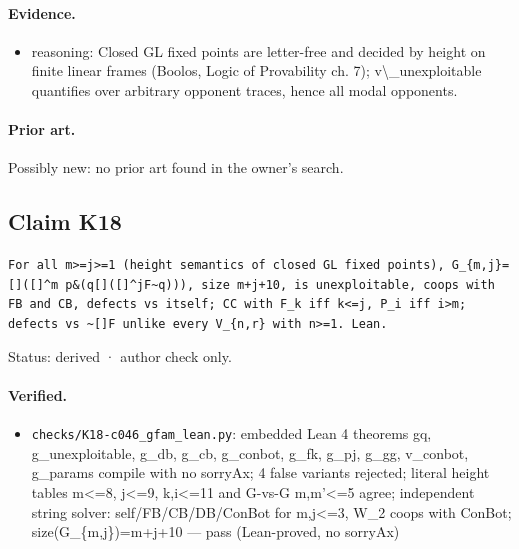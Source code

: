 \documentclass{article}
\begin{document}
\paragraph{Evidence.}
\begin{itemize}
\item reasoning: Closed GL fixed points are letter-free and decided by height on finite linear frames (Boolos, Logic of Provability ch. 7); v\textbackslash{}\_unexploitable quantifies over arbitrary opponent traces, hence all modal opponents.
\end{itemize}

\paragraph{Prior art.} Possibly new: no prior art found in the owner's search.

\subsection*{Claim K18}

\texttt{For all m\textgreater{}=j\textgreater{}=1 (height semantics of closed GL fixed points), G\_\{m,j\}=[]([]\textasciicircum{}m p\&(q\textbar{}[]([]\textasciicircum{}jF\textbar{}\textasciitilde{}q))), size m+j+10, is unexploitable, coops with FB and CB, defects vs itself; CC with F\_k iff k\textless{}=j, P\_i iff i\textgreater{}m; defects vs \textasciitilde{}[]F unlike every V\_\{n,r\} with n\textgreater{}=1. Lean.}

Status: derived · author check only.

\paragraph{Verified.}
\begin{itemize}
\item \texttt{checks/K18-c046\_gfam\_lean.py}: embedded Lean 4 theorems gq, g\_unexploitable, g\_db, g\_cb, g\_conbot, g\_fk, g\_pj, g\_gg, v\_conbot, g\_params compile with no sorryAx; 4 false variants rejected; literal height tables m\textless{}=8, j\textless{}=9, k,i\textless{}=11 and G-vs-G m,m'\textless{}=5 agree; independent string solver: self/FB/CB/DB/ConBot for m,j\textless{}=3, W\_2 coops with ConBot; size(G\_\{m,j\})=m+j+10 --- pass (Lean-proved, no sorryAx)
\end{itemize}
\end{document}
